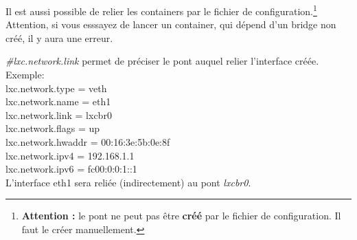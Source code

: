 Il est aussi possible de relier les containers par le fichier de configuration.\footnote{\textbf{Attention : }le pont ne peut pas \^etre \textbf{cr\'e\'e} par le fichier de configuration. Il faut le cr\'eer manuellement.}
Attention, si vous esssayez de lancer un container, qui d\'epend d'un bridge non cr\'e\'e, il y aura une erreur.

\noindent
\emph{\#lxc.network.link} permet de pr\'eciser le pont auquel relier l'interface cr\'e\'ee.\\

Exemple:\\
\noindent
lxc.network.type = veth\\
lxc.network.name = eth1\\
lxc.network.link = lxcbr0\\
lxc.network.flags = up\\
lxc.network.hwaddr = 00:16:3e:5b:0e:8f\\
lxc.network.ipv4 = 192.168.1.1\\
lxc.network.ipv6 = fc00:0:0:1::1\\

\noindent
L'interface eth1 sera reli\'ee (indirectement) au pont \emph{lxcbr0}.

